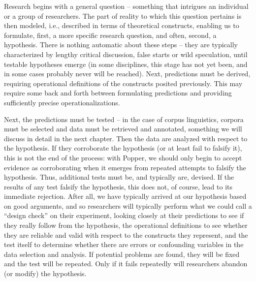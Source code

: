 Research begins with a general question -- something that intrigues an individual or a group of researchers. The part of reality to which this question pertains is then modeled, i.e., described in terms of theoretical constructs, enabling us to formulate, first, a more specific research question, and often, second, a hypothesis. There is nothing automatic about these steps -- they are typically characterized by lengthy critical discussion, false starts or wild speculation, until testable hypotheses emerge (in some disciplines, this stage has not yet been, and in some cases probably never will be reached). Next, predictions must be derived, requiring operational definitions of the constructs posited previously. This may require some back and forth between formulating predictions and providing sufficiently precise operationalizations.

Next, the predictions must be tested -- in the case of corpus linguistics, corpora must be selected and data must be retrieved and annotated, something we will discuss in detail in the next chapter. Then the data are analyzed with respect to the hypothesis. If they corroborate the hypothesis (or at least fail to falsify it), this is not the end of the process: with Popper, we should only begin to accept evidence as corroborating when it emerges from repeated attempts to falsify the hypothesis. Thus, additional tests must be, and typically are, devised. If the results of any test falsify the hypothesis, this does not, of course, lead to its immediate rejection. After all, we have typically arrived at our hypothesis based on good arguments, and so researchers will typically perform what we could call a ``design check'' on their experiment, looking closely at their predictions to see if they really follow from the hypothesis, the operational definitions to see whether they are reliable and valid with respect to the constructs they represent, and the test itself to determine whether there are errors or confounding variables in the data selection and analysis. If potential problems are found, they will be fixed and the test will be repeated. Only if it fails repeatedly will researchers abandon (or modify) the hypothesis.

